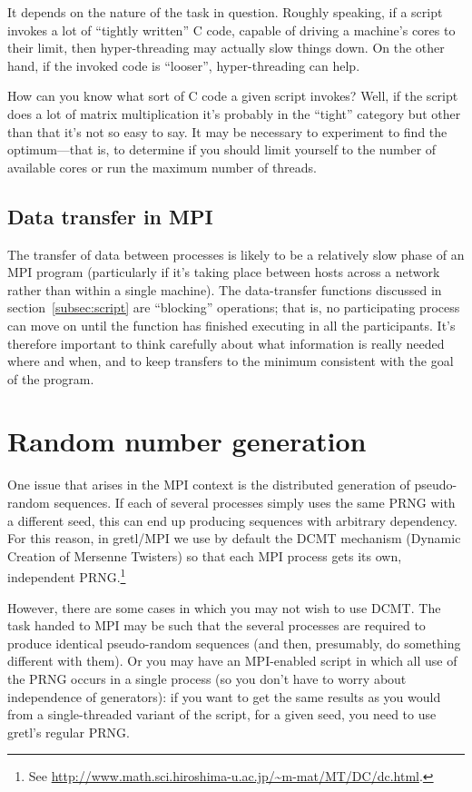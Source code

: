 \documentclass{article}
\begin{document}
It depends on the nature of the task in question. Roughly speaking, if
a script invokes a lot of ``tightly written'' C code, capable of
driving a machine's cores to their limit, then hyper-threading may
actually slow things down. On the other hand, if the invoked code is
``looser'', hyper-threading can help.

How can you know what sort of C code a given script invokes? Well, if
the script does a lot of matrix multiplication it's probably in the
``tight'' category but other than that it's not so easy to say.  It
may be necessary to experiment to find the optimum---that is, to
determine if you should limit yourself to the number of available
cores or run the maximum number of threads.

\subsection{Data transfer in MPI}
\label{sec:data-transfer}

The transfer of data between processes is likely to be a relatively slow
phase of an MPI program (particularly if it's taking place between
hosts across a network rather than within a single machine). The
data-transfer functions discussed in section~\ref{subsec:script} are
``blocking'' operations; that is, no participating process can move on
until the function has finished executing in all the participants.
It's therefore important to think carefully about what information is
really needed where and when, and to keep transfers to the minimum
consistent with the goal of the program.


\section{Random number generation}
\label{sec:random}

One issue that arises in the MPI context is the distributed generation
of pseudo-random sequences. If each of several processes simply uses
the same PRNG with a different seed, this can end up producing
sequences with arbitrary dependency. For this reason, in gretl/MPI we
use by default the \textsf{DCMT} mechanism (Dynamic Creation of
Mersenne Twisters) so that each MPI process gets its own, independent
PRNG.\footnote{See
  \url{http://www.math.sci.hiroshima-u.ac.jp/~m-mat/MT/DC/dc.html}.}

However, there are some cases in which you may not wish to use
\textsf{DCMT}. The task handed to MPI may be such that the several
processes are required to produce identical pseudo-random sequences
(and then, presumably, do something different with them). Or you may
have an MPI-enabled script in which all use of the PRNG occurs in a
single process (so you don't have to worry about independence of
generators): if you want to get the same results as you would from a
single-threaded variant of the script, for a given seed, you need to
use gretl's regular PRNG.
\end{document}
